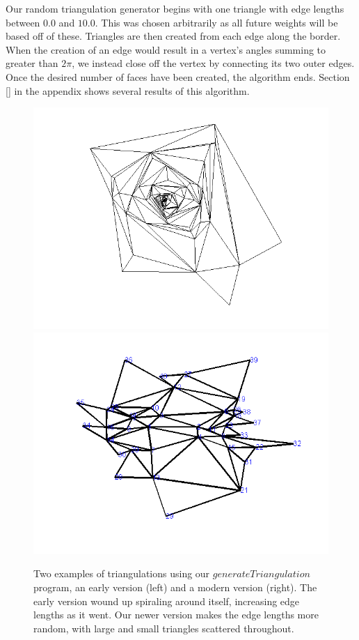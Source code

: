 \documentclass[12pt]{article}
\begin{document}
\noindent Our random triangulation generator begins with one triangle with edge lengths between $0.0$ and $10.0$. This was chosen arbitrarily as all future weights will be based off of these. Triangles are then created from each edge along the border. When the creation of an edge would result in a vertex's angles summing to greater than $2\pi$, we instead close off the vertex by connecting its two outer edges. Once the desired number of faces have been created, the algorithm ends. Section [] in the appendix shows several results of this algorithm.\newline

\begin{figure}
\centering
\includegraphics[scale = 0.45]{Pictures/gentri.png}
\includegraphics[scale = 0.45]{Pictures/gentri6.png}
\caption{Two examples of triangulations using our $generateTriangulation$ program, an early version (left) and a modern version (right). The early version wound up spiraling around itself, increasing edge lengths as it went. Our newer version makes the edge lengths more random, with large and small triangles scattered throughout. }
\end{figure}
\end{document}

